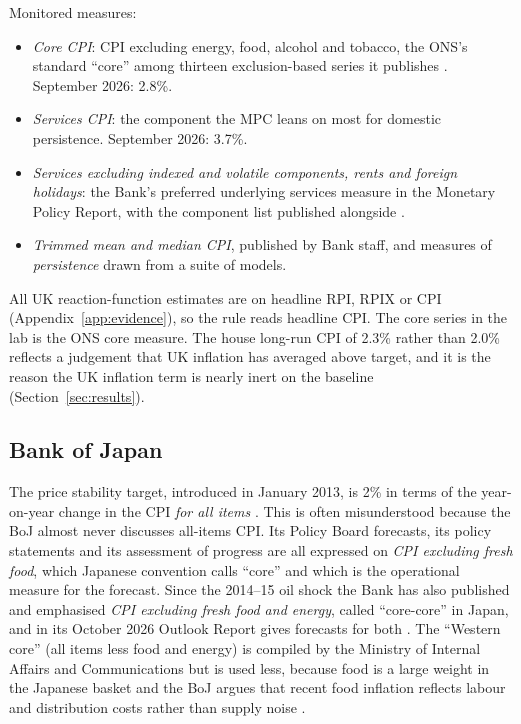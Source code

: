 \documentclass[11pt,a4paper]{article}
\begin{document}
Monitored measures:
\begin{itemize}
\item \emph{Core CPI}: CPI excluding energy, food, alcohol and tobacco, the ONS's standard ``core'' among thirteen exclusion-based series it publishes \parencite{ons2022core}. September 2026: 2.8\%.
\item \emph{Services CPI}: the component the MPC leans on most for domestic persistence. September 2026: 3.7\%.
\item \emph{Services excluding indexed and volatile components, rents and foreign holidays}: the Bank's preferred underlying services measure in the Monetary Policy Report, with the component list published alongside \parencite{boe2026mpr}.
\item \emph{Trimmed mean and median CPI}, published by Bank staff, and measures of \emph{persistence} drawn from a suite of models.
\end{itemize}
All UK reaction-function estimates are on headline RPI, RPIX or CPI (Appendix~\ref{app:evidence}), so the rule reads headline CPI. The core series in the lab is the ONS core measure. The house long-run CPI of 2.3\% rather than 2.0\% reflects a judgement that UK inflation has averaged above target, and it is the reason the UK inflation term is nearly inert on the baseline (Section~\ref{sec:results}).

\subsection{Bank of Japan}

The price stability target, introduced in January 2013, is 2\% in terms of the year-on-year change in the CPI \emph{for all items} \parencite{boj2013target,bojreview2026}. This is often misunderstood because the BoJ almost never discusses all-items CPI. Its Policy Board forecasts, its policy statements and its assessment of progress are all expressed on \emph{CPI excluding fresh food}, which Japanese convention calls ``core'' and which is the operational measure for the forecast. Since the 2014--15 oil shock the Bank has also published and emphasised \emph{CPI excluding fresh food and energy}, called ``core-core'' in Japan, and in its October 2026 Outlook Report gives forecasts for both \parencite{bojoutlook2026}. The ``Western core'' (all items less food and energy) is compiled by the Ministry of Internal Affairs and Communications but is used less, because food is a large weight in the Japanese basket and the BoJ argues that recent food inflation reflects labour and distribution costs rather than supply noise \parencite{bojreview2026}.
\end{document}
